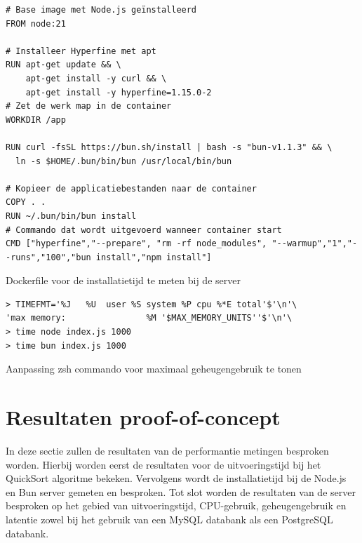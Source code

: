 \begin{listing}[H]
  \centering
  \begin{verbatim}
# Base image met Node.js geïnstalleerd
FROM node:21

# Installeer Hyperfine met apt
RUN apt-get update && \
    apt-get install -y curl && \
    apt-get install -y hyperfine=1.15.0-2
# Zet de werk map in de container
WORKDIR /app

RUN curl -fsSL https://bun.sh/install | bash -s "bun-v1.1.3" && \
  ln -s $HOME/.bun/bin/bun /usr/local/bin/bun

# Kopieer de applicatiebestanden naar de container
COPY . .
RUN ~/.bun/bin/bun install
# Commando dat wordt uitgevoerd wanneer container start
CMD ["hyperfine","--prepare", "rm -rf node_modules", "--warmup","1","--runs","100","bun install","npm install"]
      \end{verbatim}
      \caption[Dockerfile meting installatietijd]{\label{code:dockerinstall}Dockerfile voor de installatietijd te meten bij de server}
\end{listing}

\begin{listing}[H]
  \centering
  \begin{verbatim}
> TIMEFMT='%J   %U  user %S system %P cpu %*E total'$'\n'\
'max memory:                %M '$MAX_MEMORY_UNITS''$'\n'\
> time node index.js 1000
> time bun index.js 1000
      \end{verbatim}
      \caption[Dockerfile time commando]{\label{code:zshmemory}Aanpassing zsh commando voor maximaal geheugengebruik te tonen}
\end{listing}

\section{Resultaten proof-of-concept}
In deze sectie zullen de resultaten van de performantie metingen besproken worden.
Hierbij worden eerst de resultaten voor de uitvoeringstijd bij het QuickSort algoritme bekeken.
Vervolgens wordt de installatietijd bij de Node.js en Bun server gemeten en besproken.
Tot slot worden de resultaten van de server besproken op het gebied van uitvoeringstijd, CPU-gebruik, geheugengebruik en latentie
zowel bij het gebruik van een MySQL databank als een PostgreSQL databank. 


